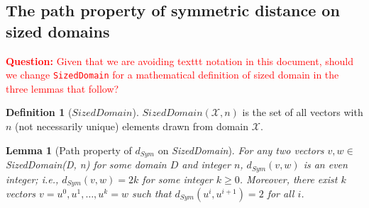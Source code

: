 \documentclass[11pt,a4paper]{article}
\newtheorem{lemma}[theorem]{Lemma}
\theoremstyle{definition}
\newtheorem{definition}[theorem]{Definition}
\newcommand{\questionc}[1]{\textcolor{red}{\textbf{Question:} #1}}
\begin{document}
\subsection{The path property of symmetric distance on sized domains}

\questionc{Given that we are avoiding texttt notation in this document, should we change \texttt{SizedDomain} for a mathematical definition of sized domain in the three lemmas that follow?}

\begin{definition}[$SizedDomain$]
    $SizedDomain(\mathcal{X},n)$ is the set of all vectors with $n$ (not necessarily unique) elements drawn from domain $\mathcal{X}$.
\end{definition}

\begin{lemma}[Path property of $d_{Sym}$ on \textit{SizedDomain}]\label{lemma:path1}
    For any two vectors $v, w \in$ \textit{SizedDomain(D, n)} for some domain $D$ and integer $n$, $d_{Sym}(v,w)$ is an even integer; i.e., $d_{Sym}(v,w) = 2k$ for some integer $k \geq 0$. Moreover, there exist $k$ vectors $v=u^0, u^1, \ldots, u^k=w$ such that $d_{Sym}(u^i,u^{i+1})=2$ for all $i$.
\end{lemma}
\end{document}
